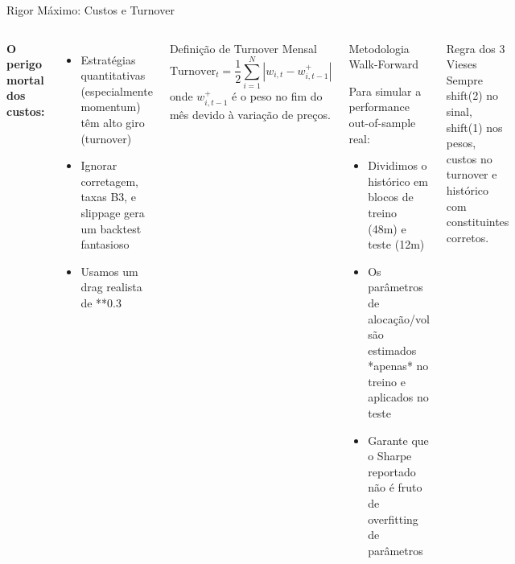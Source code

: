 \documentclass[aspectratio=169,12pt]{beamer}
\begin{document}
\begin{frame}[fragile]{Rigor Máximo: Custos e Turnover}
\begin{columns}[T]
\textbf{O perigo mortal dos custos:}
\vspace{.3em}
\begin{itemize}
  \item Estratégias quantitativas (especialmente momentum) têm alto giro (turnover)
  \item Ignorar corretagem, taxas B3, e slippage gera um backtest fantasioso
  \item Usamos um drag realista de **0.3%
\end{itemize}
\vspace{.3em}
\begin{block}{Definição de Turnover Mensal}
\[
\text{Turnover}_t = \frac{1}{2} \sum_{i=1}^N |w_{i,t} - w_{i,t-1}^+|
\]
onde $w_{i,t-1}^+$ é o peso no fim do mês devido à variação de preços.
\end{block}
\begin{block}{Metodologia Walk-Forward}

Para simular a performance out-of-sample real:
\begin{itemize}
  \item Dividimos o histórico em blocos de treino (48m) e teste (12m)
  \item Os parâmetros de alocação/vol são estimados *apenas* no treino e aplicados no teste
  \item Garante que o Sharpe reportado não é fruto de overfitting de parâmetros
\end{itemize}
\end{block}\vspace{.3em}
\begin{alertblock}{Regra dos 3 Vieses}
Sempre shift(2) no sinal, shift(1) nos pesos, custos no turnover e histórico com constituintes corretos.
\end{alertblock}
\end{columns}
\end{frame}
\end{document}
